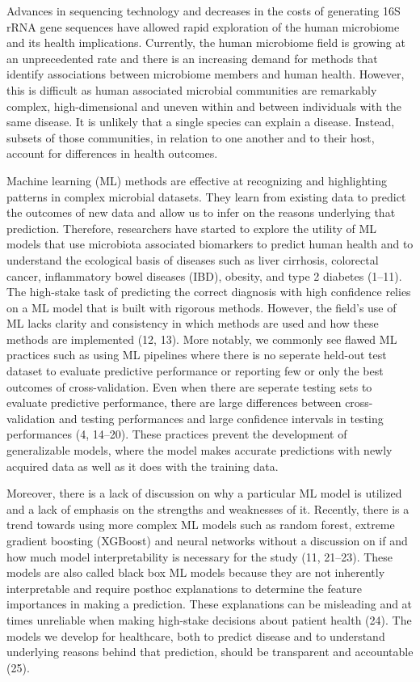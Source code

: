 \documentclass[11pt,]{article}
\begin{document}
Advances in sequencing technology and decreases in the costs of
generating 16S rRNA gene sequences have allowed rapid exploration of the
human microbiome and its health implications. Currently, the human
microbiome field is growing at an unprecedented rate and there is an
increasing demand for methods that identify associations between
microbiome members and human health. However, this is difficult as human
associated microbial communities are remarkably complex,
high-dimensional and uneven within and between individuals with the same
disease. It is unlikely that a single species can explain a disease.
Instead, subsets of those communities, in relation to one another and to
their host, account for differences in health outcomes.

Machine learning (ML) methods are effective at recognizing and
highlighting patterns in complex microbial datasets. They learn from
existing data to predict the outcomes of new data and allow us to infer
on the reasons underlying that prediction. Therefore, researchers have
started to explore the utility of ML models that use microbiota
associated biomarkers to predict human health and to understand the
ecological basis of diseases such as liver cirrhosis, colorectal cancer,
inflammatory bowel diseases (IBD), obesity, and type 2 diabetes (1--11).
The high-stake task of predicting the correct diagnosis with high
confidence relies on a ML model that is built with rigorous methods.
However, the field's use of ML lacks clarity and consistency in which
methods are used and how these methods are implemented (12, 13). More
notably, we commonly see flawed ML practices such as using ML pipelines
where there is no seperate held-out test dataset to evaluate predictive
performance or reporting few or only the best outcomes of
cross-validation. Even when there are seperate testing sets to evaluate
predictive performance, there are large differences between
cross-validation and testing performances and large confidence intervals
in testing performances (4, 14--20). These practices prevent the
development of generalizable models, where the model makes accurate
predictions with newly acquired data as well as it does with the
training data.

Moreover, there is a lack of discussion on why a particular ML model is
utilized and a lack of emphasis on the strengths and weaknesses of it.
Recently, there is a trend towards using more complex ML models such as
random forest, extreme gradient boosting (XGBoost) and neural networks
without a discussion on if and how much model interpretability is
necessary for the study (11, 21--23). These models are also called black
box ML models because they are not inherently interpretable and require
posthoc explanations to determine the feature importances in making a
prediction. These explanations can be misleading and at times unreliable
when making high-stake decisions about patient health (24). The models
we develop for healthcare, both to predict disease and to understand
underlying reasons behind that prediction, should be transparent and
accountable (25).
\end{document}
